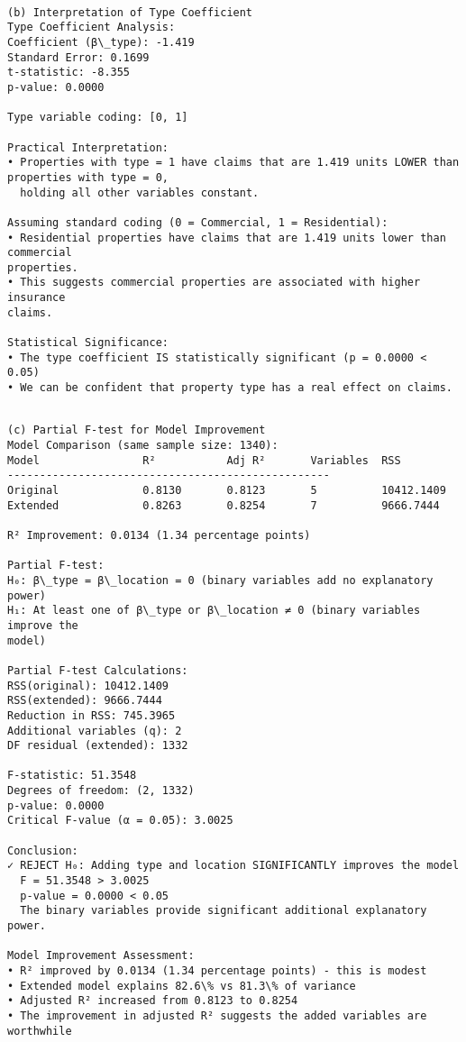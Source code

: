 \documentclass[8pt, twocolumn]{extarticle}
\begin{document}
    \begin{Verbatim}[commandchars=\\\{\}]

(b) Interpretation of Type Coefficient
Type Coefficient Analysis:
Coefficient (β\_type): -1.419
Standard Error: 0.1699
t-statistic: -8.355
p-value: 0.0000

Type variable coding: [0, 1]

Practical Interpretation:
• Properties with type = 1 have claims that are 1.419 units LOWER than
properties with type = 0,
  holding all other variables constant.

Assuming standard coding (0 = Commercial, 1 = Residential):
• Residential properties have claims that are 1.419 units lower than commercial
properties.
• This suggests commercial properties are associated with higher insurance
claims.

Statistical Significance:
• The type coefficient IS statistically significant (p = 0.0000 < 0.05)
• We can be confident that property type has a real effect on claims.
    \end{Verbatim}

    \begin{Verbatim}[commandchars=\\\{\}]

(c) Partial F-test for Model Improvement
Model Comparison (same sample size: 1340):
Model                R²           Adj R²       Variables  RSS
--------------------------------------------------
Original             0.8130       0.8123       5          10412.1409
Extended             0.8263       0.8254       7          9666.7444

R² Improvement: 0.0134 (1.34 percentage points)

Partial F-test:
H₀: β\_type = β\_location = 0 (binary variables add no explanatory power)
H₁: At least one of β\_type or β\_location ≠ 0 (binary variables improve the
model)

Partial F-test Calculations:
RSS(original): 10412.1409
RSS(extended): 9666.7444
Reduction in RSS: 745.3965
Additional variables (q): 2
DF residual (extended): 1332

F-statistic: 51.3548
Degrees of freedom: (2, 1332)
p-value: 0.0000
Critical F-value (α = 0.05): 3.0025

Conclusion:
✓ REJECT H₀: Adding type and location SIGNIFICANTLY improves the model
  F = 51.3548 > 3.0025
  p-value = 0.0000 < 0.05
  The binary variables provide significant additional explanatory power.

Model Improvement Assessment:
• R² improved by 0.0134 (1.34 percentage points) - this is modest
• Extended model explains 82.6\% vs 81.3\% of variance
• Adjusted R² increased from 0.8123 to 0.8254
• The improvement in adjusted R² suggests the added variables are worthwhile
    \end{Verbatim}
\end{document}

